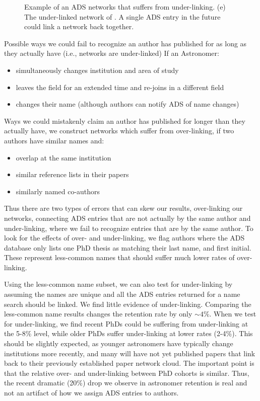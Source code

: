 \documentclass[preprint2]{aastex}
\begin{document}
\begin{figure}
  \caption{Example of an ADS networks that suffers from under-linking.  (e) The under-linked network of \citet{Capelo12}.  A single ADS entry in the future could link a network back together.}
\end{figure}


Possible ways we could fail to recognize an author has published for as long as they actually have (i.e., networks are under-linked) If an Astronomer:
\begin{itemize}
\item{simultaneously changes institution and area of study}
\item{leaves the field for an extended time and re-joins in a different field}
\item{changes their name (although authors can notify ADS of name changes)}
\end{itemize}

Ways we could mistakenly claim an author has published for longer than they actually have, we construct networks which suffer from over-linking, if two authors have similar names and:
\begin{itemize}
\item{overlap at the same institution}
\item{similar reference lists in their papers}
  \item{similarly named co-authors}
\end{itemize}

Thus there are two types of errors that can skew our results, over-linking our networks, connecting ADS entries that are not actually by the same author and under-linking, where we fail to recognize entries that are by the same author.  To look for the effects of over- and under-linking, we flag authors where the ADS database only lists one PhD thesis as matching their last name, and first initial. These represent less-common names that should suffer much lower rates of over-linking.

Using the less-common name subset, we can also test for under-linking by assuming the names are unique and all the ADS entries returned for a name search should be linked.  We find little evidence of under-linking. Comparing the less-common name results changes the retention rate by only $\sim4$\%. When we test for under-linking, we find recent PhDs could be suffering from under-linking at the 5-8\% level, while older PhDs suffer under-linking at lower rates (2-4\%).  This should be slightly expected, as younger astronomers have typically change institutions more recently, and many will have not yet published papers that link back to their previously established paper network cloud.  The important point is that the relative over- and under-linking between PhD cohorts is similar.  Thus, the recent dramatic (20\%) drop we observe in astronomer retention is real and not an artifact of how we assign ADS entries to authors.
\end{document}
